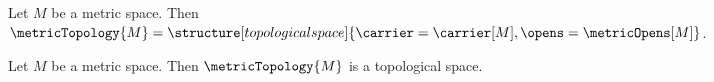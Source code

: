 
\begin{definition}\label{style_metric_topology}
    Let $M$ be a metric space. Then
    $\metricTopology{M}=
        \structure[topological space]{
            \carrier=\carrier[M],
            \opens=\metricOpens[M]
        }$.
\end{definition}

\begin{theorem}\label{style_metric_topology_is_topological}
    Let $M$ be a metric space. Then $\metricTopology{M}$ is a topological
    space.
\end{theorem}
